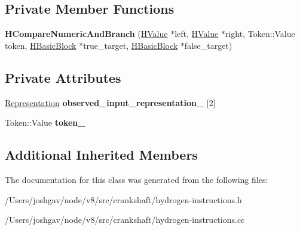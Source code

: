 \subsection*{Private Member Functions}
\begin{DoxyCompactItemize}
\item 
{\bfseries H\+Compare\+Numeric\+And\+Branch} (\hyperlink{classv8_1_1internal_1_1_h_value}{H\+Value} $\ast$left, \hyperlink{classv8_1_1internal_1_1_h_value}{H\+Value} $\ast$right, Token\+::\+Value token, \hyperlink{classv8_1_1internal_1_1_h_basic_block}{H\+Basic\+Block} $\ast$true\+\_\+target, \hyperlink{classv8_1_1internal_1_1_h_basic_block}{H\+Basic\+Block} $\ast$false\+\_\+target)\hypertarget{classv8_1_1internal_1_1_h_compare_numeric_and_branch_ac39646b586b733a0bbf8bbe331e2bd3f}{}\label{classv8_1_1internal_1_1_h_compare_numeric_and_branch_ac39646b586b733a0bbf8bbe331e2bd3f}

\end{DoxyCompactItemize}
\subsection*{Private Attributes}
\begin{DoxyCompactItemize}
\item 
\hyperlink{classv8_1_1internal_1_1_representation}{Representation} {\bfseries observed\+\_\+input\+\_\+representation\+\_\+} \mbox{[}2\mbox{]}\hypertarget{classv8_1_1internal_1_1_h_compare_numeric_and_branch_a26ca02e7db8868ef922f0f3f80ab447c}{}\label{classv8_1_1internal_1_1_h_compare_numeric_and_branch_a26ca02e7db8868ef922f0f3f80ab447c}

\item 
Token\+::\+Value {\bfseries token\+\_\+}\hypertarget{classv8_1_1internal_1_1_h_compare_numeric_and_branch_ae3f2f2d8f31f60ade2ad02fd1d7feacc}{}\label{classv8_1_1internal_1_1_h_compare_numeric_and_branch_ae3f2f2d8f31f60ade2ad02fd1d7feacc}

\end{DoxyCompactItemize}
\subsection*{Additional Inherited Members}


The documentation for this class was generated from the following files\+:\begin{DoxyCompactItemize}
\item 
/\+Users/joshgav/node/v8/src/crankshaft/hydrogen-\/instructions.\+h\item 
/\+Users/joshgav/node/v8/src/crankshaft/hydrogen-\/instructions.\+cc\end{DoxyCompactItemize}
